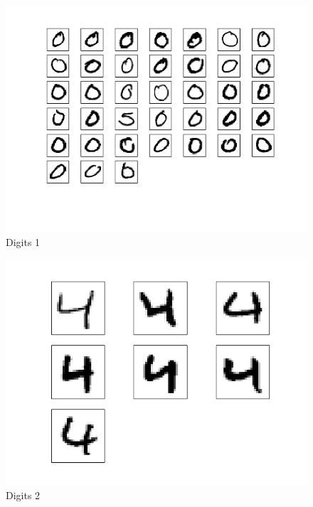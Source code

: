 \documentclass[10pt]{article}
\begin{document}
\begin{figure}
\begin{center}
\includegraphics[scale=0.5]{meansA1}
\caption{Digits 1}
\end{center}
\end{figure}
\begin{figure}
\begin{center}
\includegraphics[scale=0.5]{meansA2}
\caption{Digits 2}
\end{center}
\end{figure}
\end{document}

